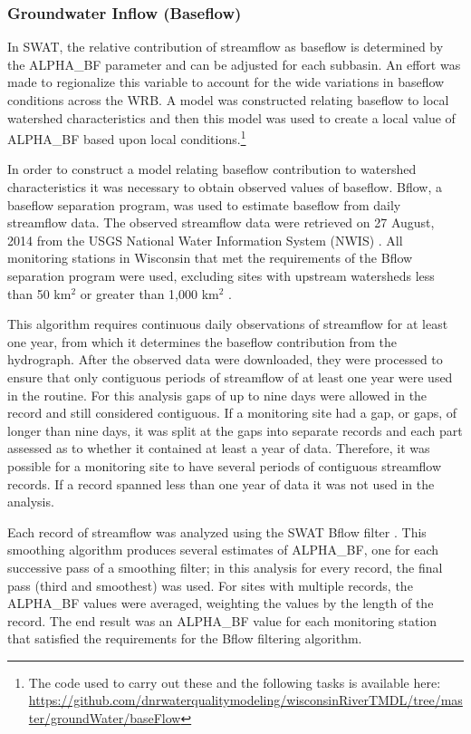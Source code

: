\subsubsection{Groundwater Inflow (Baseflow)}\label{sec:baseflow}
	In SWAT, the relative contribution of streamflow as baseflow is determined by the ALPHA\_BF parameter and can be adjusted for each subbasin. An effort was made to regionalize this variable to account for the wide variations in baseflow conditions across the WRB. A model was constructed relating baseflow to local watershed characteristics and then this model was used to create a local value of ALPHA\_BF based upon local conditions.\footnote{The code used to carry out these and the following tasks is available here: \url{https://github.com/dnrwaterqualitymodeling/wisconsinRiverTMDL/tree/master/groundWater/baseFlow}}
	
	In order to construct a model relating baseflow contribution to watershed characteristics it was necessary to obtain observed values of baseflow. Bflow, a baseflow separation program, \citep{arnold_automated_1995} was used to estimate baseflow from daily streamflow data. The observed streamflow data were retrieved on 27 August, 2014 from the USGS National Water Information System (NWIS) . All monitoring stations in Wisconsin that met the requirements of the Bflow separation program were used, excluding sites with upstream watersheds less than 50 km$^2$ or greater than 1,000 km$^2$ \citep{arnold_regional_2000}.

	This algorithm requires continuous daily observations of streamflow for at least one year, from which it determines the baseflow contribution from the hydrograph.	After the observed data were downloaded, they were processed to ensure that only contiguous periods of streamflow of at least one year were used in the routine. For this analysis gaps of up to nine days were allowed in the record and still considered contiguous. If a monitoring site had a gap, or gaps, of longer than nine days, it was split at the gaps into separate records and each part assessed as to whether it contained at least a year of data. Therefore, it was possible for a monitoring site to have several periods of contiguous streamflow records. If a record spanned less than one year of data it was not used in the analysis.
	
	Each record of streamflow was analyzed using the SWAT Bflow filter \citep{arnold_automated_1995}. This smoothing algorithm produces several estimates of ALPHA\_BF, one for each successive pass of a smoothing filter; in this analysis for every record, the final pass (third and smoothest) was used. For sites with multiple records, the ALPHA\_BF values were averaged, weighting the values by the length of the record. The end result was an ALPHA\_BF value for each monitoring station that satisfied the requirements for the Bflow filtering algorithm.  

